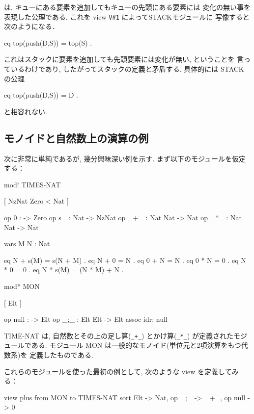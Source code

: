 は, キューにある要素を追加してもキューの先頭にある要素には
変化の無い事を表現した公理である. 
これを view \texttt{V\#1} によってSTACKモジュールに
写像すると次のようになる．

\begin{vvtm}
\begin{simplev}
  eq top(push(D,S)) = top(S) .
\end{simplev}
\end{vvtm}
これはスタックに要素を追加しても先頭要素には変化が無い, ということを
言っているわけであり, したがってスタックの定義と矛盾する.
具体的には STACK の公理

\begin{vvtm}
\begin{simplev}
  eq top(push(D,S)) = D .
\end{simplev}
\end{vvtm}
と相容れない.

\subsection{モノイドと自然数上の演算の例}

次に非常に単純であるが, 幾分興味深い例を示す.
まず以下のモジュールを仮定する：

\begin{vvtm}
\begin{simplev}
mod! TIMES-NAT {
  [ NzNat Zero < Nat ]

  op 0 : -> Zero
  op s_ : Nat -> NzNat
  op _+_ : Nat Nat -> Nat
  op _*_ : Nat Nat -> Nat

  vars M N : Nat 
    
  eq N + s(M) = s(N + M) .
  eq N + 0 = N . 
  eq 0 + N = N .
  eq 0 * N = 0 .
  eq N * 0 = 0 .
  eq N * s(M) = (N * M) + N .
}

mod* MON {
  [ Elt ]

  op null :  ->  Elt
  op _;_ : Elt Elt -> Elt {assoc idr: null} 
}
\end{simplev}
\end{vvtm}

TIME-NAT は, 自然数とその上の足し算(\verb:_+_:) とかけ算(\verb:_*_:)
が定義されたモジュールである. 
モジュール MON は一般的なモノイド(単位元と2項演算をもつ代数系)を
定義したものである.

これらのモジュールを使った最初の例として,
次のような view を定義してみる：

\begin{vvtm}
\begin{simplev}
  view plus from MON to TIMES-NAT {
    sort Elt -> Nat, 
    op _;_ -> _+_,  
    op null -> 0 
  }
\end{simplev}
\end{vvtm}


